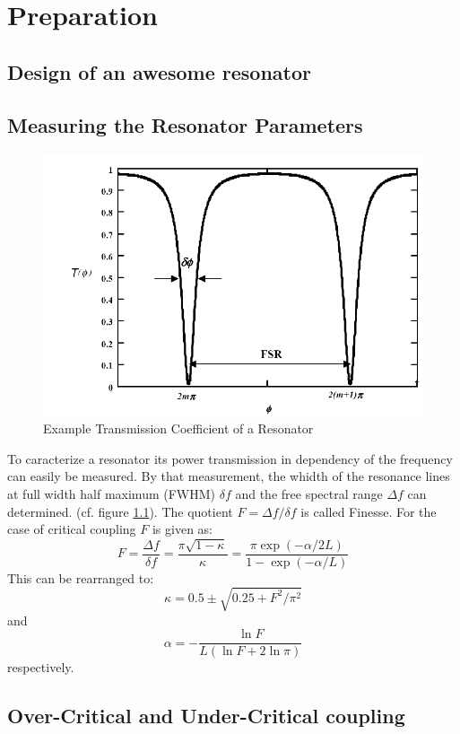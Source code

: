 \chapter{Preparation}

\section{Design of an awesome resonator}

\section{Measuring the Resonator Parameters}

\begin{figure}[h]%
\centering
\includegraphics[width=.5\columnwidth]{Grafiken/S21.pdf}%
\caption{Example Transmission Coefficient of a Resonator}%
\label{fig:S21}%
\end{figure}

To caracterize a resonator its power transmission in dependency of the frequency can easily be measured. By that measurement, the whidth of the resonance lines at full width half maximum (FWHM) $\delta f$ and the free spectral range $\Delta f$ can determined. (cf. figure \ref{fig:S21}). The quotient $F= \Delta f/\delta f$ is called Finesse. For the case of critical coupling $F$ is given as:
\begin{equation}
 F = \frac{\Delta f}{\delta f} = \frac{\pi\sqrt{1-\kappa}}{\kappa}=\frac{\pi\exp\left(-\alpha/2L\right)}{1-\exp\left(-\alpha/L\right)}
\end{equation}
This can be rearranged to:
\begin{equation}
 \kappa = 0.5 \pm \sqrt{0.25+F^2/\pi^2}
\end{equation}
and
\begin{equation}
\alpha = -\frac{\ln F}{L(\ln F+2\ln\pi)} 
\end{equation}
respectively.

\section{Over-Critical and Under-Critical coupling}